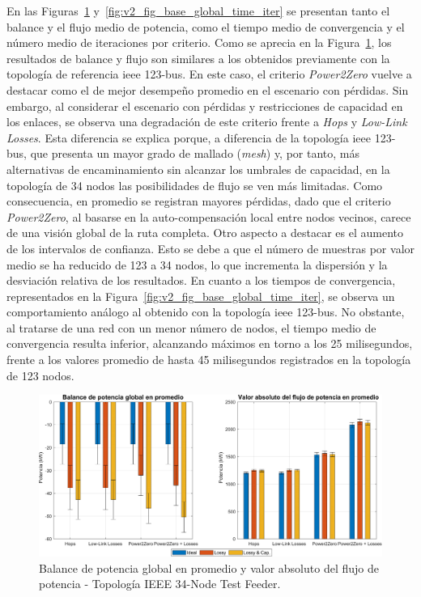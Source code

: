 En las Figuras~\ref{fig:v2_fig_base_global_powers} y~\ref{fig:v2_fig_base_global_time_iter} se presentan tanto el balance y el flujo medio de potencia, como el tiempo medio de convergencia y el número medio de iteraciones por criterio. Como se aprecia en la Figura~\ref{fig:v2_fig_base_global_powers}, los resultados de balance y flujo son similares a los obtenidos previamente con la topología de referencia \gls{ieee} 123-bus. En este caso, el criterio \textit{Power2Zero} vuelve a destacar como el de mejor desempeño promedio en el escenario con pérdidas. Sin embargo, al considerar el escenario con pérdidas y restricciones de capacidad en los enlaces, se observa una degradación de este criterio frente a \textit{Hops} y \textit{Low-Link Losses}. Esta diferencia se explica porque, a diferencia de la topología \gls{ieee} 123-bus, que presenta un mayor grado de mallado (\textit{mesh}) y, por tanto, más alternativas de encaminamiento sin alcanzar los umbrales de capacidad, en la topología de 34 nodos las posibilidades de flujo se ven más limitadas. Como consecuencia, en promedio se registran mayores pérdidas, dado que el criterio \textit{Power2Zero}, al basarse en la auto-compensación local entre nodos vecinos, carece de una visión global de la ruta completa. Otro aspecto a destacar es el aumento de los intervalos de confianza. Esto se debe a que el número de muestras por valor medio se ha reducido de 123 a 34 nodos, lo que incrementa la dispersión y la desviación relativa de los resultados. En cuanto a los tiempos de convergencia, representados en la Figura~\ref{fig:v2_fig_base_global_time_iter}, se observa un comportamiento análogo al obtenido con la topología \gls{ieee} 123-bus. No obstante, al tratarse de una red con un menor número de nodos, el tiempo medio de convergencia resulta inferior, alcanzando máximos en torno a los 25 milisegundos, frente a los valores promedio de hasta 45 milisegundos registrados en la topología de 123 nodos.



\begin{figure}[ht!]
    \centering
    \includegraphics[width=\textwidth]{fig/07_bloste/bloste_18.pdf}
    \caption{Balance de potencia global en promedio y valor absoluto del flujo de potencia - Topología IEEE 34-Node Test Feeder.}
    \label{fig:v2_fig_base_global_powers}
\end{figure}

